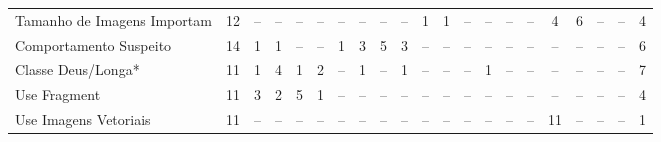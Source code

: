 \begin{table*}[t]
\begin{tabular}{@{}p{3.8cm}p{0.3cm}p{.2cm}p{.2cm}p{.2cm}p{.2cm}p{.2cm}p{.2cm}p{.2cm}p{.2cm}p{.2cm}p{.4cm}p{.4cm}p{.4cm}p{.4cm}p{.4cm}p{.4cm}p{.4cm}p{.4cm}p{.4cm}p{0.2cm}@{}}
Tamanho de Imagens Importam					& \multicolumn{1}{c}{12} 	& \multicolumn{1}{c}{--} 	& \multicolumn{1}{c}{--} 	& \multicolumn{1}{c}{--} 	& \multicolumn{1}{c}{--} 	& \multicolumn{1}{c}{--} 	& \multicolumn{1}{c}{--} 	& \multicolumn{1}{c}{--} 	& \multicolumn{1}{c}{--} 	& \multicolumn{1}{c}{1} 	& \multicolumn{1}{c}{1} 	& \multicolumn{1}{c}{--} 	& \multicolumn{1}{c}{--} 	& \multicolumn{1}{c}{--} 	& \multicolumn{1}{c}{--} 	& \multicolumn{1}{c}{4} 	& \multicolumn{1}{c}{6} 	& \multicolumn{1}{c}{--} 	& \multicolumn{1}{c}{--} 	& \multicolumn{1}{c}{4} \\
Comportamento Suspeito						& \multicolumn{1}{c}{14} 	& \multicolumn{1}{c}{1} 	& \multicolumn{1}{c}{1} 	& \multicolumn{1}{c}{--} 	& \multicolumn{1}{c}{--} 	& \multicolumn{1}{c}{1} 	& \multicolumn{1}{c}{3} 	& \multicolumn{1}{c}{5} 	& \multicolumn{1}{c}{3} 	& \multicolumn{1}{c}{--} 	& \multicolumn{1}{c}{--} 	& \multicolumn{1}{c}{--} 	& \multicolumn{1}{c}{--} 	& \multicolumn{1}{c}{--} 	& \multicolumn{1}{c}{--} 	& \multicolumn{1}{c}{--} 	& \multicolumn{1}{c}{--} 	& \multicolumn{1}{c}{--} 	& \multicolumn{1}{c}{--} 	& \multicolumn{1}{c}{6} \\
Classe Deus/Longa*							& \multicolumn{1}{c}{11} 	& \multicolumn{1}{c}{1} 	& \multicolumn{1}{c}{4} 	& \multicolumn{1}{c}{1} 	& \multicolumn{1}{c}{2} 	& \multicolumn{1}{c}{--} 	& \multicolumn{1}{c}{1} 	& \multicolumn{1}{c}{--} 	& \multicolumn{1}{c}{1} 	& \multicolumn{1}{c}{--} 	& \multicolumn{1}{c}{--} 	& \multicolumn{1}{c}{--} 	& \multicolumn{1}{c}{1} 	& \multicolumn{1}{c}{--} 	& \multicolumn{1}{c}{--} 	& \multicolumn{1}{c}{--} 	& \multicolumn{1}{c}{--} 	& \multicolumn{1}{c}{--} 	& \multicolumn{1}{c}{--} 	& \multicolumn{1}{c}{7} \\
Use Fragment								& \multicolumn{1}{c}{11} 	& \multicolumn{1}{c}{3} 	& \multicolumn{1}{c}{2} 	& \multicolumn{1}{c}{5} 	& \multicolumn{1}{c}{1} 	& \multicolumn{1}{c}{--} 	& \multicolumn{1}{c}{--} 	& \multicolumn{1}{c}{--} 	& \multicolumn{1}{c}{--} 	& \multicolumn{1}{c}{--} 	& \multicolumn{1}{c}{--} 	& \multicolumn{1}{c}{--} 	& \multicolumn{1}{c}{--} 	& \multicolumn{1}{c}{--} 	& \multicolumn{1}{c}{--} 	& \multicolumn{1}{c}{--} 	& \multicolumn{1}{c}{--} 	& \multicolumn{1}{c}{--} 	& \multicolumn{1}{c}{--} 	& \multicolumn{1}{c}{4} \\
Use Imagens Vetoriais						& \multicolumn{1}{c}{11} 	& \multicolumn{1}{c}{--} 	& \multicolumn{1}{c}{--} 	& \multicolumn{1}{c}{--} 	& \multicolumn{1}{c}{--} 	& \multicolumn{1}{c}{--} 	& \multicolumn{1}{c}{--} 	& \multicolumn{1}{c}{--} 	& \multicolumn{1}{c}{--} 	& \multicolumn{1}{c}{--} 	& \multicolumn{1}{c}{--} 	& \multicolumn{1}{c}{--} 	& \multicolumn{1}{c}{--} 	& \multicolumn{1}{c}{--} 	& \multicolumn{1}{c}{--} 	& \multicolumn{1}{c}{11} 	& \multicolumn{1}{c}{--} 	& \multicolumn{1}{c}{--} 	& \multicolumn{1}{c}{--} 	& \multicolumn{1}{c}{1} \\

\end{tabular}
\end{table*}
